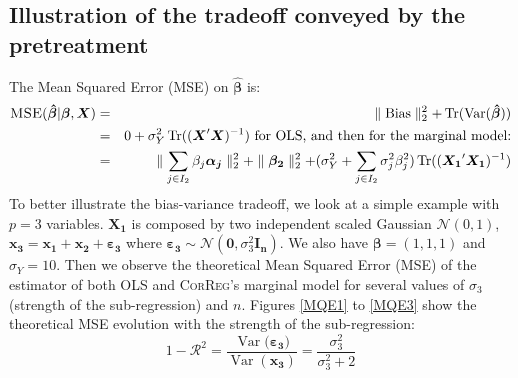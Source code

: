 \documentclass[11pt,a4paper]{article}
\begin{document}
	\subsection{Illustration of the tradeoff conveyed by the pretreatment}		  
	 The Mean Squared Error (\textsc{MSE}) on $\boldsymbol{\hat{\beta}}$ is:
	\begin{eqnarray}
		\textsc{MSE}(\boldsymbol{\hat{\beta}}|\boldsymbol{\beta},\boldsymbol{X})&=&\parallel \operatorname{Bias}\parallel_2^2+\operatorname{Tr}(\operatorname{Var}(\boldsymbol{\hat{\beta}})) \\
			&=& 0 + \sigma_Y^2 \operatorname{Tr}((\boldsymbol{X}'\boldsymbol{X})^{-1}) \textrm{ for OLS, and then for the marginal model:} \\
			&=& \parallel\sum_{j \in I_2}\beta_{j}\boldsymbol{\alpha_j} \parallel_2^2 +\parallel \boldsymbol{\beta_2}\parallel^2_2 + (\sigma^2_Y+\sum_{j \in I_2}\sigma^2_{j}\beta_{j}^2 ) \operatorname{Tr}((\boldsymbol{X_1}' \boldsymbol{X_1})^{-1})
	\end{eqnarray}	 
	To better illustrate the bias-variance tradeoff, we look at a simple example with $p=3$ variables. $\boldsymbol{X_1}$ is composed by two independent scaled Gaussian $\mathcal{N}(0,1)$, $\boldsymbol{x_3}=\boldsymbol{x_1}+\boldsymbol{x_2}+\boldsymbol{\varepsilon_3}$ where $\boldsymbol{\varepsilon_3}\sim{\mathcal{N}(\boldsymbol{0},\sigma_3^2\boldsymbol{I_n})}$. We also have $\boldsymbol{\beta}=(1,1,1)$ and $\sigma_Y=10$. Then we observe the theoretical Mean Squared Error (MSE) of the estimator of both OLS and \textsc{CorReg}'s marginal  model for several values of $\sigma_3$ (strength of the sub-regression) and $n$. Figures \ref{MQE1} to \ref{MQE3} show the theoretical MSE evolution with the strength of the sub-regression:
	\begin{equation}
		1-\mathcal{R}^2=\frac{\operatorname{Var}(\boldsymbol{\varepsilon_3)}}{\operatorname{Var}(\boldsymbol{x_3})}=\frac{\sigma_3^2}{\sigma_3^2+2}
	\end{equation}
	
\end{document}
